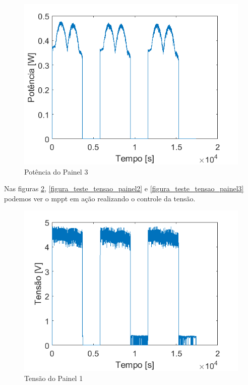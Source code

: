\begin{figure}[!htpb]
\begin{center}
\includegraphics[scale=0.5]{figures/testPanel3Power.png}
\caption{Potência do Painel 3}
\label{figura_teste_potencia_painel3}
\end{center}
\end{figure}

Nas figuras \ref{figura_teste_tensao_painel1}, \ref{figura_teste_tensao_painel2} e \ref{figura_teste_tensao_painel3} podemos ver o \gls{mppt} em ação realizando o controle da tensão.

\begin{figure}[!htpb]
\begin{center}
\includegraphics[scale=0.5]{figures/testPanel1Voltage.png}
\caption{Tensão do Painel 1}
\label{figura_teste_tensao_painel1}
\end{center}
\end{figure}


